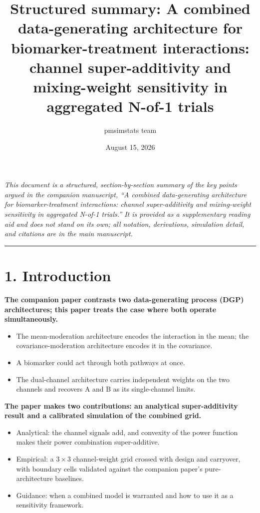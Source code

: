 \documentclass[
  11pt,
]{article}
\title{Structured summary: A combined data-generating architecture for biomarker-treatment interactions: channel super-additivity and mixing-weight sensitivity in aggregated N-of-1 trials}
\author{pmsimstats team}
\date{August 15, 2026}
\begin{document}
\maketitle

{
\setcounter{tocdepth}{2}
\tableofcontents
}
\emph{This document is a structured, section-by-section summary of the key points argued in the companion manuscript, ``A combined data-generating architecture for biomarker-treatment interactions: channel super-additivity and mixing-weight sensitivity in aggregated N-of-1 trials.'' It is provided as a supplementary reading aid and does not stand on its own; all notation, derivations, simulation detail, and citations are in the main manuscript.}

\bigskip\noindent

\rule{\textwidth}{0.4pt}\bigskip

\section{1. Introduction}

\textbf{The companion paper contrasts two data-generating process
(DGP) architectures; this paper treats the case where both operate
simultaneously.}

\begin{itemize}\setlength{\itemsep}{2pt}\setlength{\parskip}{0pt}
\item The mean-moderation architecture encodes the interaction in the mean;
  the covariance-moderation architecture encodes it in the covariance.
\item A biomarker could act through both pathways at once.
\item The dual-channel architecture carries independent weights on the two channels
  and recovers A and B as its single-channel limits.
\end{itemize}

\textbf{The paper makes two contributions: an analytical
super-additivity result and a calibrated simulation of the combined
grid.}

\begin{itemize}\setlength{\itemsep}{2pt}\setlength{\parskip}{0pt}
\item Analytical: the channel signals add, and convexity of the
  power function makes their power combination super-additive.
\item Empirical: a $3 \times 3$ channel-weight grid crossed with
  design and carryover, with boundary cells validated against the
  companion paper's pure-architecture baselines.
\item Guidance: when a combined model is warranted and how to use it
  as a sensitivity framework.
\end{itemize}
\end{document}
